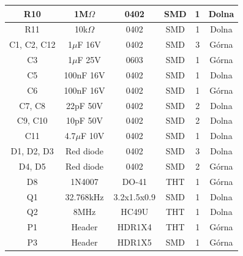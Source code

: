 \documentclass[12pt]{article} %
\numberwithin{equation}{subsection}
\numberwithin{figure}{section}
\numberwithin{table}{section}
\begin{document}
\begin{table}[!h]
\begin{tabular}{|c|c|c|c|c|c|}
R10                 & 1M$\Omega$                    & 0402             & SMD             & 1              & Dolna            \\ \hline
R11                 & 10k$\Omega$                   & 0402             & SMD             & 1              & Dolna            \\ \hline
C1, C2, C12         & 1$\mu$F 16V                & 0402             & SMD             & 3              & Górna            \\ \hline
C3                  & 1$\mu$F 25V                & 0603             & SMD             & 1              & Górna            \\ \hline
C5                  & 100nF 16V              & 0402             & SMD             & 1              & Dolna            \\ \hline
C6                  & 100nF 16V              & 0402             & SMD             & 1              & Górna            \\ \hline
C7, C8              & 22pF 50V               & 0402             & SMD             & 2              & Dolna            \\ \hline
C9, C10             & 10pF 50V               & 0402             & SMD             & 2              & Dolna            \\ \hline
C11                 & 4.7$\mu$F 10V              & 0402             & SMD             & 1              & Dolna            \\ \hline
D1, D2, D3          & Red diode              & 0402             & SMD             & 3              & Dolna            \\ \hline
D4, D5              & Red diode              & 0402             & SMD             & 2              & Górna            \\ \hline
D8                  & 1N4007                 & DO-41            & THT             & 1              & Górna            \\ \hline
Q1                  & 32.768kHz              & 3.2x1.5x0.9    & SMD             & 1              & Dolna            \\ \hline
Q2                  & 8MHz                   & HC49U            & THT             & 1              & Dolna            \\ \hline
P1                  & Header                 & HDR1X4           & THT             & 1              & Górna            \\ \hline
P3                  & Header                 & HDR1X5           & SMD             & 1              & Górna            \\ \hline

\end{tabular}
\end{table}
\end{document}
